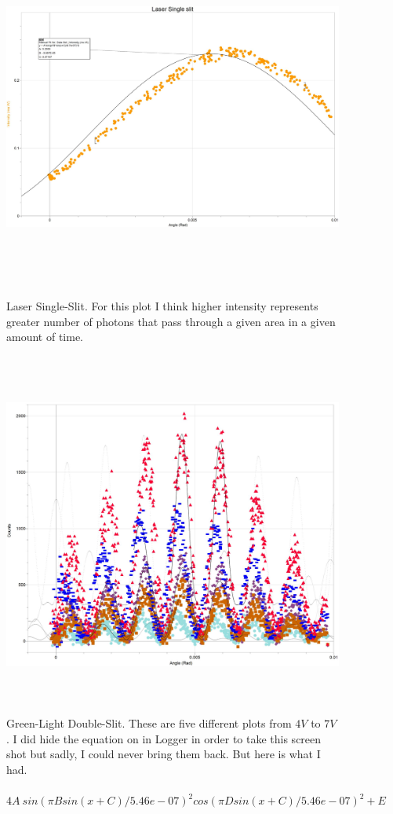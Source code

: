 \documentclass[fleqn]{article}
\begin{document}
  \pagebreak

  \begin{figure}[h!]
    \includegraphics[height=12cm, width=18cm]{Fig2.JPG}
    \caption{
      Laser Single-Slit. For this plot I think higher intensity represents greater number of photons 
      that pass through a given area in a given amount of time. 
    }
  \end{figure}

  \pagebreak

  \begin{figure}[h!]
    \includegraphics[height=12cm, width=18cm]{Fig3Top.JPG}
    \caption{
      Green-Light Double-Slit. These are five different plots from $4 V$ to $7 V$. I did hide the equation on in 
      Logger in order to take this screen shot but sadly, I could never bring them back. But here is what I had. 
      \\
      \\
      $
        4A ~ sin(\pi Bsin(x+C)/5.46e-07)^2cos( \pi D sin(x+C)/5.46e-07)^2+E
      $
    }
  \end{figure}
\end{document}
